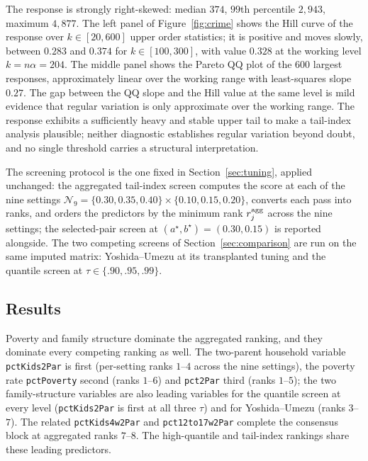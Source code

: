The response is strongly right-skewed: median $374$, $99$th percentile
$2{,}943$, maximum $4{,}877$. The left panel of Figure~\ref{fig:crime}
shows the Hill curve of the response over $k\in[20,600]$ upper order
statistics; it is positive and moves slowly, between $0.283$ and
$0.374$ for $k\in[100,300]$, with value $0.328$ at the working level
$k=n\alpha=204$. The middle panel shows the Pareto QQ plot of the $600$
largest responses, approximately linear over the working range with
least-squares slope $0.27$. The gap between the QQ slope and the Hill
value at the same level is mild evidence that regular variation is only
approximate over the working range. The response exhibits a
sufficiently heavy and stable upper tail to make a tail-index analysis
plausible; neither diagnostic establishes regular variation beyond
doubt, and no single threshold carries a structural interpretation.

The screening protocol is the one fixed in Section~\ref{sec:tuning},
applied unchanged: the aggregated tail-index screen computes the score
at each of the nine settings
$\mathcal N_9=\{0.30,0.35,0.40\}\times\{0.10,0.15,0.20\}$, converts
each pass into ranks, and orders the predictors by the minimum rank
$r_j^{\rm agg}$ across the nine settings; the selected-pair screen at
$(a^\star,b^\star)=(0.30,0.15)$ is reported alongside. The two
competing screens of Section~\ref{sec:comparison} are run on the same
imputed matrix: Yoshida--Umezu at its transplanted tuning and the
quantile screen at $\tau\in\{.90,.95,.99\}$.

\subsection{Results}

Poverty and family structure dominate the aggregated ranking, and they
dominate every competing ranking as well. The two-parent household
variable \texttt{pctKids2Par} is first (per-setting ranks $1$--$4$
across the nine settings), the poverty rate \texttt{pctPoverty} second
(ranks $1$--$6$) and \texttt{pct2Par} third (ranks $1$--$5$); the two
family-structure variables are also leading variables for the quantile
screen at every level (\texttt{pctKids2Par} is first at all three
$\tau$) and for Yoshida--Umezu (ranks $3$--$7$). The related
\texttt{pctKids4w2Par} and \texttt{pct12to17w2Par} complete the
consensus block at aggregated ranks $7$--$8$. The high-quantile and
tail-index rankings share these leading predictors.

